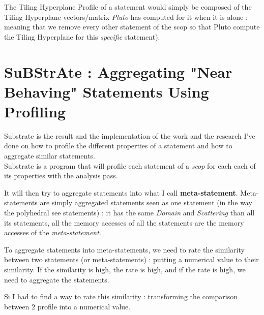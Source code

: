 \documentclass[paper=a4, fontsize=11.5pt]{scrartcl}
\numberwithin{equation}{section}        %
\numberwithin{figure}{section}          %
\numberwithin{table}{section}               %
\begin{document}
        The Tiling Hyperplane Profile of a statement would simply be composed
        of the Tiling Hyperplane vectors/matrix \textit{Pluto} has computed for
        it when it is alone : meaning that we remove every other
        statement of the scop so that Pluto compute the Tiling Hyperplane for this \textit{specific}
        statement).



\section{SuBStrAte : Aggregating "Near Behaving" Statements Using Profiling}
    Substrate is the result and the implementation of the work and the research I've done
    on how to profile the different properties of a statement and how to aggregate similar
    statements.\\
    Substrate is a program that will profile each statement of a \textit{scop} for
    each each of its properties with the analysis pass.

    It will then try to aggregate
    statements into what I call \textbf{meta-statement}. Meta-statements are simply
    aggregated statements seen as one statement (in the way the polyhedral see statements)
    : it has the same \textit{Domain} and \textit{Scattering} than all its statements,
    all the memory accesses of all the statements are the memory accesses of the \textit{meta-statement}.

    To aggregate statements into meta-statements, we need to rate the similarity between two
    statements (or meta-statements) : putting a numerical value to their similarity.
    If the similarity is high, the rate is high, and if the rate is high, we need to
    aggregate the statements.

    Si I had to find a way to rate this similarity : transforming the comparison between
    2 profile into a numerical value.
\end{document}
